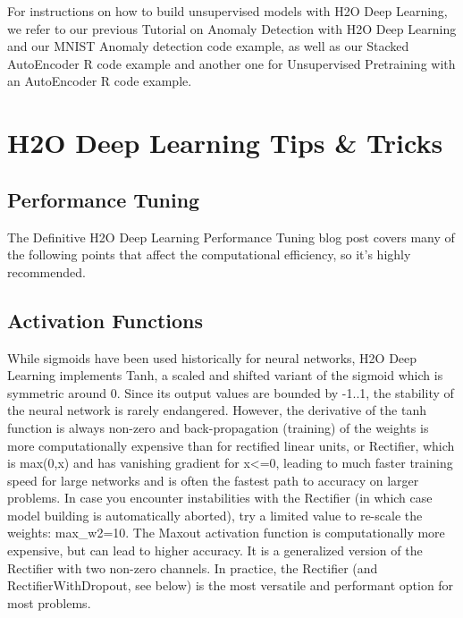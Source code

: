 \documentclass[]{book}
\begin{document}
For instructions on how to build unsupervised models with H2O Deep Learning, we refer to our previous Tutorial on Anomaly Detection with H2O Deep Learning and our MNIST Anomaly detection code example, as well as our Stacked AutoEncoder R code example and another one for Unsupervised Pretraining with an AutoEncoder R code example.

\hypertarget{h2o-deep-learning-tips-tricks}{%
\section{H2O Deep Learning Tips \& Tricks}\label{h2o-deep-learning-tips-tricks}}

\hypertarget{performance-tuning}{%
\subsection{Performance Tuning}\label{performance-tuning}}

The Definitive H2O Deep Learning Performance Tuning blog post covers many of the following points that affect the computational efficiency, so it's highly recommended.

\hypertarget{activation-functions}{%
\subsection{Activation Functions}\label{activation-functions}}

While sigmoids have been used historically for neural networks, H2O Deep Learning implements Tanh, a scaled and shifted variant of the sigmoid which is symmetric around 0. Since its output values are bounded by -1..1, the stability of the neural network is rarely endangered. However, the derivative of the tanh function is always non-zero and back-propagation (training) of the weights is more computationally expensive than for rectified linear units, or Rectifier, which is max(0,x) and has vanishing gradient for x\textless{}=0, leading to much faster training speed for large networks and is often the fastest path to accuracy on larger problems. In case you encounter instabilities with the Rectifier (in which case model building is automatically aborted), try a limited value to re-scale the weights: max\_w2=10. The Maxout activation function is computationally more expensive, but can lead to higher accuracy. It is a generalized version of the Rectifier with two non-zero channels. In practice, the Rectifier (and RectifierWithDropout, see below) is the most versatile and performant option for most problems.
\end{document}
